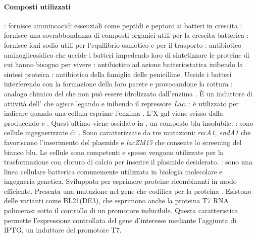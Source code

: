 \paragraph{Composti utilizzati}
\begin{itemize}[person]\label{it:prepLBsolido-CompostiUtilizzati}
	\itemb[Triptone]: fornisce amminoacidi essenziali come peptidi e peptoni ai batteri in crescita
	: fornisce una sovrabbondanza di composti organici utili per la crescita batterica
	: fornisce ioni sodio utili per l'equilibrio osmotico e per il trasporto
	: antibiotico aminoglicosidico che uccide i batteri impedendo loro di sintetizzare le proteine di cui hanno bisogno per vivere
	: antibiotico ad azione batteriostatica inibendo la sintesi proteica
	: antibiotico della famiglia delle penicilline. Uccide i batteri interferendo con la formazione della loro parete e provocandone la rottura
	: analogo chimico del  che non può essere idrolizzato dall'enzima . È un induttore di attività dell' che agisce legando e inibendo il repressore \emph{Lac}.
	: è utilizzato per indicare quando una cellula esprime l'enzima . L'\gls{X-gal} viene scisso dalla  producendo  e . Quest'ultimo viene ossidato in , un composto blu insolubile.
	: sono cellule ingegnerizzate di . Sono caratterizzate da tre mutazioni: \emph{recA1}, \emph{endA1} che favoriscono l'inserimento del plasmide e \mbox{\emph{lacZ\textDelta\!M15}} che consente lo screening del bianco blu. Le cellule sono competenti e spesso vengono utilizzate per la trasformazione con cloruro di calcio per inserire il plasmide desiderato.
	\itemb[Cellule BL21]: sono una linea cellulare batterica comunemente utilizzata in biologia molecolare e ingegneria genetica. Sviluppata per esprimere proteine ricombinanti in modo efficiente. Presenta una mutazione nel gene che codifica per la proteina . Esistono delle varianti come BL21(DE3), che esprimono anche la proteina T7 RNA polimerasi sotto il controllo di un promotore inducibile. Questa caratteristica permette l'espressione controllata del gene d'interesse mediante l'aggiunta di \gls{IPTG}, un induttore del promotore T7.
\end{itemize}

